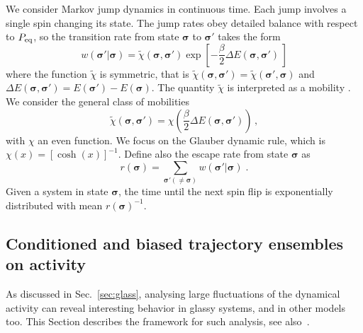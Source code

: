 \documentclass{iopart}
\begin{document}
We consider Markov jump dynamics in continuous time. Each jump involves a single spin changing its state.  The jump rates obey detailed balance with respect to $P_{\rm eq}$, so the transition rate from state $\bm{\sigma}$ to $\bm{\sigma}'$ takes the form
\begin{equation}
  \label{eq:def:general_transition_rates}
  w(\bm{\sigma}'| \bm{\sigma}) = \widetilde{\chi}(\bm{\sigma}, \bm{\sigma}') 
  \exp\left[ - \frac{\beta}{2} \Delta E(\bm{\sigma}, \bm{\sigma}') \,  \right]
\end{equation}
where the function $\widetilde{\chi}$ is symmetric, that is $\widetilde{\chi}(\bm{\sigma}, \bm{\sigma}')= \widetilde{\chi}(\bm{\sigma}', \bm{\sigma})$ and $\Delta E(\bm{\sigma}, \bm{\sigma}') = E(\bm{\sigma}')-E(\bm{\sigma})$.  The quantity $\widetilde{\chi}$ is interpreted as a mobility \cite{kaiser2018canonical,maes2007and}.  We consider the general class of mobilities 
\begin{equation}
  \label{eq:12}
  \widetilde{\chi}(\bm{\sigma},\bm{\sigma}') = \chi\left(\frac{\beta}{2} \Delta E(\bm{\sigma}, \bm{\sigma}') \right) \, ,
\end{equation}
with $\chi$ an even function. We focus on the Glauber dynamic rule, which is $\chi(x) = [\cosh(x)]^{-1}$.
Define also the escape rate from state $\bm{\sigma}$ as
\begin{equation}
  \label{eq:escrate}
  r(\bm{\sigma}) = \sum_{\bm{\sigma}' (\neq \bm{\sigma})}w(\bm{\sigma}'|\bm{\sigma}) \; .
\end{equation}
Given a system in state $\bm{\sigma}$, the time until the next spin flip is exponentially distributed with mean $r(\bm{\sigma})^{-1}$. 


\subsection{Conditioned and biased trajectory ensembles on activity}
\label{sec:biased_ens_ld}

As discussed in Sec.~\ref{sec:glass}, analysing large fluctuations of the dynamical activity can reveal interesting behavior in glassy systems, and in other models too.  This Section describes the framework for such analysis, see also~\cite{lecomte2007thermodynamic,derrida2007non,garrahan2009first,chetrite2015nonequilibrium,Jack2019}.
\end{document}
